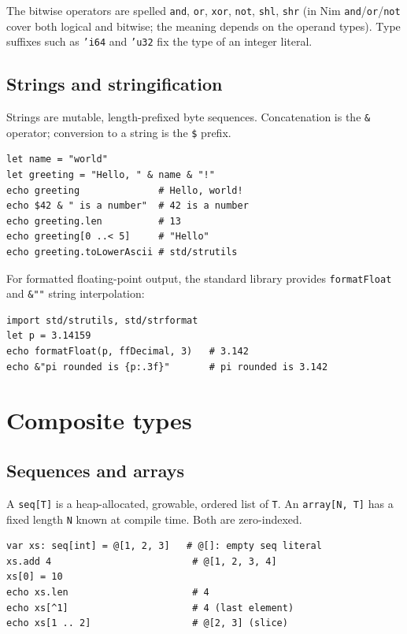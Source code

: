 \documentclass[justified, sixbynine]{tufte-book}
\def\ft{\small\tt}
\theoremstyle{plain}%
\newtheorem * {corollary}{Corollary}
\theoremstyle{definition}
\theoremstyle{remark}
\newtheorem * {remark}{Remark}
\newtheorem * {note}{Note}
\begin{document}
\begin{fullwidth}
The bitwise operators are spelled {\ft and}, {\ft or}, {\ft xor}, {\ft not}, {\ft shl}, {\ft shr} (in Nim {\ft and}/{\ft or}/{\ft not} cover both logical and bitwise; the meaning depends on the operand types). Type suffixes such as {\ft 'i64} and {\ft 'u32} fix the type of an integer literal.

\goodbreak\subsection{Strings and stringification}


Strings are mutable, length-prefixed byte sequences. Concatenation is the {\ft \&} operator; conversion to a string is the {\ft \$} prefix.

\begin{lstlisting}
let name = "world"
let greeting = "Hello, " & name & "!"
echo greeting              # Hello, world!
echo $42 & " is a number"  # 42 is a number
echo greeting.len          # 13
echo greeting[0 ..< 5]     # "Hello"
echo greeting.toLowerAscii # std/strutils
\end{lstlisting}

For formatted floating-point output, the standard library provides {\ft formatFloat} and {\ft \&""} string interpolation:

\begin{lstlisting}
import std/strutils, std/strformat
let p = 3.14159
echo formatFloat(p, ffDecimal, 3)   # 3.142
echo &"pi rounded is {p:.3f}"       # pi rounded is 3.142
\end{lstlisting}

\goodbreak\section{Composite types}

\goodbreak\subsection{Sequences and arrays}


A {\ft seq[T]} is a heap-allocated, growable, ordered list of {\ft T}. An {\ft array[N, T]} has a fixed length {\ft N} known at compile time. Both are zero-indexed.

\begin{lstlisting}
var xs: seq[int] = @[1, 2, 3]   # @[]: empty seq literal
xs.add 4                         # @[1, 2, 3, 4]
xs[0] = 10
echo xs.len                      # 4
echo xs[^1]                      # 4 (last element)
echo xs[1 .. 2]                  # @[2, 3] (slice)


\end{lstlisting}
\end{fullwidth}
\end{document}
